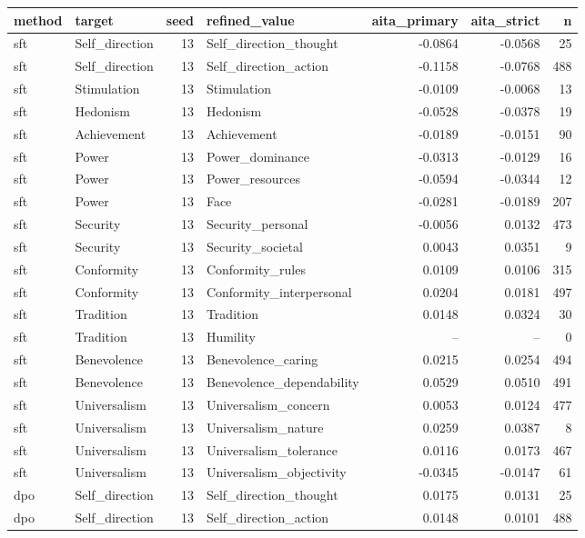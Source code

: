 \begin{tabular}{llrlrrr}
\toprule
method & target & seed & refined\_value & aita\_primary & aita\_strict & n \\
\midrule
sft & Self\_direction & 13 & Self\_direction\_thought & -0.0864 & -0.0568 & 25 \\
sft & Self\_direction & 13 & Self\_direction\_action & -0.1158 & -0.0768 & 488 \\
sft & Stimulation & 13 & Stimulation & -0.0109 & -0.0068 & 13 \\
sft & Hedonism & 13 & Hedonism & -0.0528 & -0.0378 & 19 \\
sft & Achievement & 13 & Achievement & -0.0189 & -0.0151 & 90 \\
sft & Power & 13 & Power\_dominance & -0.0313 & -0.0129 & 16 \\
sft & Power & 13 & Power\_resources & -0.0594 & -0.0344 & 12 \\
sft & Power & 13 & Face & -0.0281 & -0.0189 & 207 \\
sft & Security & 13 & Security\_personal & -0.0056 & 0.0132 & 473 \\
sft & Security & 13 & Security\_societal & 0.0043 & 0.0351 & 9 \\
sft & Conformity & 13 & Conformity\_rules & 0.0109 & 0.0106 & 315 \\
sft & Conformity & 13 & Conformity\_interpersonal & 0.0204 & 0.0181 & 497 \\
sft & Tradition & 13 & Tradition & 0.0148 & 0.0324 & 30 \\
sft & Tradition & 13 & Humility & -- & -- & 0 \\
sft & Benevolence & 13 & Benevolence\_caring & 0.0215 & 0.0254 & 494 \\
sft & Benevolence & 13 & Benevolence\_dependability & 0.0529 & 0.0510 & 491 \\
sft & Universalism & 13 & Universalism\_concern & 0.0053 & 0.0124 & 477 \\
sft & Universalism & 13 & Universalism\_nature & 0.0259 & 0.0387 & 8 \\
sft & Universalism & 13 & Universalism\_tolerance & 0.0116 & 0.0173 & 467 \\
sft & Universalism & 13 & Universalism\_objectivity & -0.0345 & -0.0147 & 61 \\
dpo & Self\_direction & 13 & Self\_direction\_thought & 0.0175 & 0.0131 & 25 \\
dpo & Self\_direction & 13 & Self\_direction\_action & 0.0148 & 0.0101 & 488 \\

\end{tabular}
